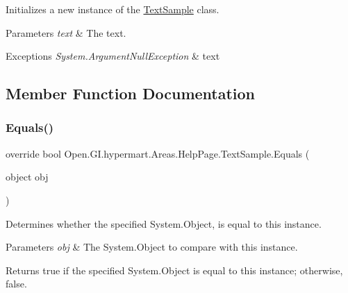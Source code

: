 Initializes a new instance of the \hyperlink{class_open_1_1_g_i_1_1hypermart_1_1_areas_1_1_help_page_1_1_text_sample}{Text\+Sample} class. 


\begin{DoxyParams}{Parameters}
{\em text} & The text.\\
\hline
\end{DoxyParams}

\begin{DoxyExceptions}{Exceptions}
{\em System.\+Argument\+Null\+Exception} & text\\
\hline
\end{DoxyExceptions}


\subsection{Member Function Documentation}
\hypertarget{class_open_1_1_g_i_1_1hypermart_1_1_areas_1_1_help_page_1_1_text_sample_a05b2a9d64c25c827a041e83516b4cb18}{}\label{class_open_1_1_g_i_1_1hypermart_1_1_areas_1_1_help_page_1_1_text_sample_a05b2a9d64c25c827a041e83516b4cb18} 
\subsubsection{\texorpdfstring{Equals()}{Equals()}}
{\footnotesize\ttfamily override bool Open.\+G\+I.\+hypermart.\+Areas.\+Help\+Page.\+Text\+Sample.\+Equals (\begin{DoxyParamCaption}\item[{object}]{obj }\end{DoxyParamCaption})}



Determines whether the specified System.\+Object, is equal to this instance. 


\begin{DoxyParams}{Parameters}
{\em obj} & The System.\+Object to compare with this instance.\\
\hline
\end{DoxyParams}
\begin{DoxyReturn}{Returns}
{\ttfamily true} if the specified System.\+Object is equal to this instance; otherwise, {\ttfamily false}. 
\end{DoxyReturn}
\hypertarget{class_open_1_1_g_i_1_1hypermart_1_1_areas_1_1_help_page_1_1_text_sample_a020567c194ea1dff6b48f033c7dee994}{}\label{class_open_1_1_g_i_1_1hypermart_1_1_areas_1_1_help_page_1_1_text_sample_a020567c194ea1dff6b48f033c7dee994} 
